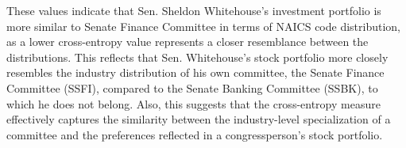 \documentclass[15pt,letterpaper]{article}
\begin{document}
These values indicate that Sen. Sheldon Whitehouse's investment portfolio is more similar to Senate Finance Committee in terms of NAICS code distribution, as a lower cross-entropy value represents a closer resemblance between the distributions.
This reflects that Sen. Whitehouse's stock portfolio more closely resembles the industry distribution of his own committee, the Senate Finance Committee (SSFI), compared to the Senate Banking Committee (SSBK), to which he does not belong.
Also, this suggests that the cross-entropy measure effectively captures the similarity between the industry-level specialization of a committee and the preferences reflected in a congressperson's stock portfolio. 









\end{document}
